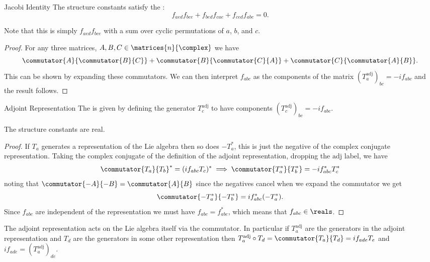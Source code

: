 \begin{thm}{Jacobi Identity}{}
    The structure constants satisfy the :
    \begin{equation}
        f_{aed}f_{bce} + f_{bed}f_{cae} + f_{ced}f_{abc} = 0.
    \end{equation}
    \begin{rmk}
        Note that this is simply \(f_{aed}f_{bce}\) with a sum over cyclic permutations of \(a\), \(b\), and \(c\).
    \end{rmk}
    \begin{proof}
        For any three matrices, \(A, B, C \in \matrices{n}{\complex}\) we have
        \begin{equation}
            \commutator{A}{\commutator{B}{C}} + \commutator{B}{\commutator{C}{A}} + \commutator{C}{\commutator{A}{B}}.
        \end{equation}
        This can be shown by expanding these commutators.
        We can then interpret \(f_{abc}\) as the components of the matrix \((T_a^{\mathrm{adj}})_{bc} = -if_{abc}\) and the result follows.
    \end{proof}
\end{thm}

\begin{dfn}{Adjoint Representation}{}
    The  is given by defining the generator \(T_c^{\mathrm{adj}}\) to have components \((T_c^{\mathrm{adj}})_{bc} = -if_{abc}\).
\end{dfn}

\begin{crl}{}{}
    The structure constants are real.
    \begin{proof}
        If \(T_a\) generates a representation of the Lie algebra then so does \(-T_a^*\), this is just the negative of the complex conjugate representation.
        Taking the complex conjugate of the definition of the adjoint representation, dropping the \(\mathrm{adj}\) label, we have
        \begin{equation}
            \commutator{T_a}{T_b}^* = (if_{abc}T_c)^* \implies \commutator{T_a^*}{T_b^*} = -if_{abc}^*T_c^*
        \end{equation}
        noting that \(\commutator{-A}{-B} = \commutator{A}{B}\) since the negatives cancel when we expand the commutator we get
        \begin{equation}
            \commutator{-T_a^*}{-T_b^*} = if_{abc}^*(-T_a^*).
        \end{equation}
        Since \(f_{abc}\) are independent of the representation we must have \(f_{abc} = f_{abc}^*\), which means that \(f_{abc} \in \reals\).
    \end{proof}
\end{crl}
The adjoint representation acts on the Lie algebra itself via the commutator.
In particular if \(T_a^{\mathrm{adj}}\) are the generators in the adjoint representation and \(T_d\) are the generators in some other representation then \(T_a^{\mathrm{adj}} \circ T_d = \commutator{T_a}{T_d} = if_{ade}T_e\) and \(if_{ade} = (T_a^{\mathrm{adj}})_{de}\).

